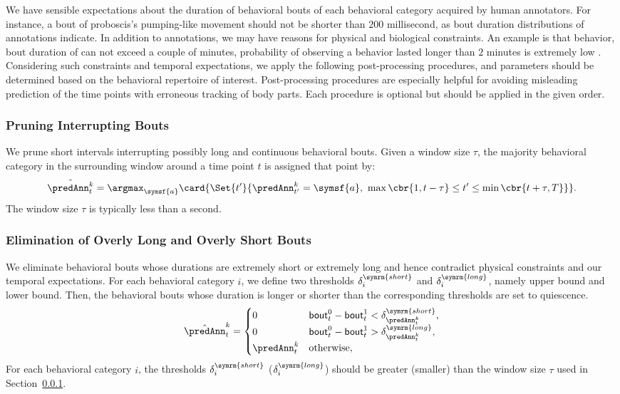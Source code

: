 We have sensible expectations about the duration of behavioral bouts of each behavioral category acquired by human annotators.
For instance, a bout of proboscis's pumping-like movement should not be shorter than $200$ millisecond, as bout duration distributions of annotations indicate.
In addition to annotations, we may have reasons for physical and biological constraints.
An example is that \Grooming behavior, bout duration of \Grooming can not exceed a couple of minutes, probability of observing a \Grooming behavior lasted longer than $2$ minutes is extremely low \citep{qiao_automated_2018}.
Considering such constraints and temporal expectations, we apply the following post-processing procedures, and parameters should be determined based on the behavioral repertoire of interest.
Post-processing procedures are especially helpful for avoiding misleading prediction of the time points with erroneous tracking of body parts.
Each procedure is optional but should be applied in the given order.

\subsubsection{Pruning Interrupting Bouts}\label{section:pruning-interrupting-bouts}
We prune short intervals interrupting possibly long and continuous behavioral bouts.
Given a window size $\tau$, the majority behavioral category in the surrounding window around a time point $t$ is assigned that point by:
\begin{equation}
	\hat{\predAnn^k_t} = \argmax_{\symsf{a}} \card{\Set{t^\prime}{\predAnn^k_{t^\prime}=\symsf{a}, \ \max\cbr{1, t-\tau} \leq t^\prime \leq \min\cbr{t+\tau, T}}}.
\end{equation}
The window size $\tau$ is typically less than a second.

\subsubsection{Elimination of Overly Long and Overly Short Bouts}
We eliminate behavioral bouts whose durations are extremely short or extremely long and hence contradict physical constraints and our temporal expectations.
For each behavioral category $i$, we define two thresholds $\delta^{\symrm{short}}_i$ and $\delta^{\symrm{long}}_i$, namely upper bound and lower bound.
Then, the behavioral bouts whose duration is longer or shorter than the corresponding thresholds are set to quiescence.
\begin{equation}
	\hat{\predAnn}^k_t=
	\begin{cases}
		0            & \mathsf{bout}^0_t - \mathsf{bout}^1_t < \delta^{\symrm{short}}_{\predAnn^k_t}, \\
		0            & \mathsf{bout}^0_t - \mathsf{bout}^1_t > \delta^{\symrm{long}}_{\predAnn^k_t},  \\
		\predAnn^k_t & \textnormal{otherwise},
	\end{cases}
\end{equation}
For each behavioral category $i$, the thresholds $\delta^{\symrm{short}}_i$ ($\delta^{\symrm{long}}_i$) should be greater (smaller) than the window size $\tau$ used in Section~\ref{section:pruning-interrupting-bouts}.
